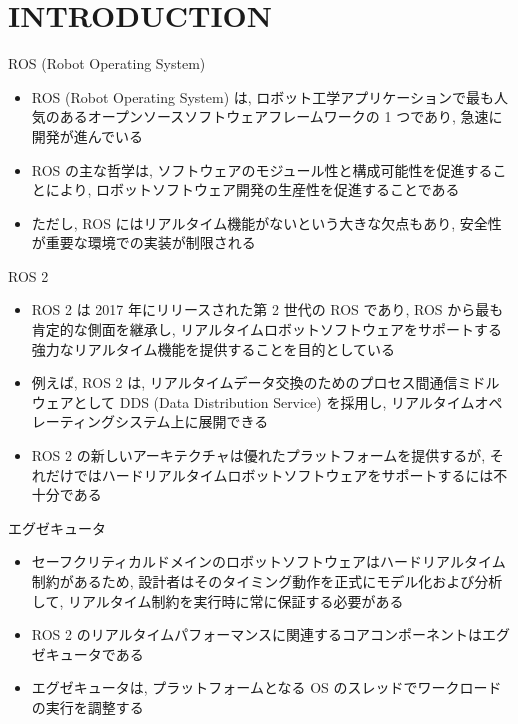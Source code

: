 
\section{INTRODUCTION}
\label{sec: introduction}

\begin{frame}{ROS (Robot Operating System)}
    \begin{itemize}
        \item ROS (Robot Operating System) は, ロボット工学アプリケーションで最も人気のあるオープンソースソフトウェアフレームワークの 1 つであり, 急速に開発が進んでいる
        \item ROS の主な哲学は, ソフトウェアのモジュール性と構成可能性を促進することにより, ロボットソフトウェア開発の生産性を促進することである
        \item ただし, ROS にはリアルタイム機能がないという大きな欠点もあり, 安全性が重要な環境での実装が制限される

    \end{itemize}
\end{frame}

\begin{frame}{ROS 2}
    \begin{itemize}
        \item ROS 2 は 2017 年にリリースされた第 2 世代の ROS であり, ROS から最も肯定的な側面を継承し, リアルタイムロボットソフトウェアをサポートする強力なリアルタイム機能を提供することを目的としている
        \item 例えば, ROS 2 は, リアルタイムデータ交換のためのプロセス間通信ミドルウェアとして DDS (Data Distribution Service) を採用し, リアルタイムオペレーティングシステム上に展開できる
        \item ROS 2 の新しいアーキテクチャは優れたプラットフォームを提供するが, それだけではハードリアルタイムロボットソフトウェアをサポートするには不十分である
    \end{itemize}
\end{frame}

\begin{frame}{エグゼキュータ}
    \begin{itemize}
        \item セーフクリティカルドメインのロボットソフトウェアはハードリアルタイム制約があるため, 設計者はそのタイミング動作を正式にモデル化および分析して, リアルタイム制約を実行時に常に保証する必要がある
        \item ROS 2 のリアルタイムパフォーマンスに関連するコアコンポーネントはエグゼキュータである
        \item エグゼキュータは, プラットフォームとなる OS のスレッドでワークロードの実行を調整する

    \end{itemize}
\end{frame}

